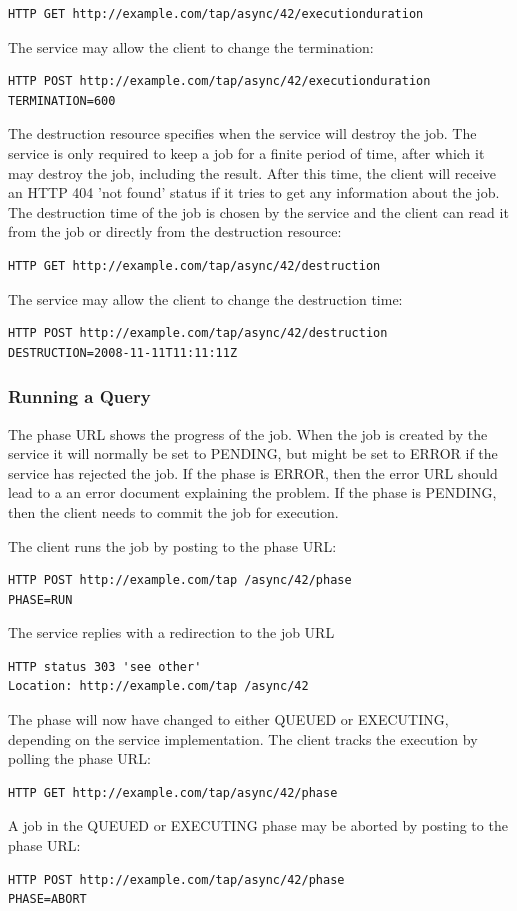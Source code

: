 \documentclass[11pt,a4paper]{ivoa}
\begin{document}
{\begin{verbatim}
HTTP GET http://example.com/tap/async/42/executionduration
\end{verbatim}
The service may allow the client to change the termination:
\begin{verbatim}
HTTP POST http://example.com/tap/async/42/executionduration
TERMINATION=600
\end{verbatim}
The destruction resource specifies when the service will destroy the job. The 
service is only required to keep a job for a finite period of time, after which 
it may destroy the job, including the result. After this time, the client will 
receive an HTTP 404 'not found' status if it tries to get any information about 
the job. The destruction time of the job is chosen by the service and the client 
can read it from the job or directly from the destruction resource:
\begin{verbatim}
HTTP GET http://example.com/tap/async/42/destruction
\end{verbatim}
The service may allow the client to change the destruction time:
\begin{verbatim}
HTTP POST http://example.com/tap/async/42/destruction
DESTRUCTION=2008-11-11T11:11:11Z
\end{verbatim}

\subsubsection{Running a Query}
The phase URL shows the progress of the job. When the job is created by the 
service it will normally be set to PENDING, but might be set to ERROR if the 
service has rejected the job. If the phase is ERROR, then the error URL should 
lead to a an error document explaining the problem. If the phase is PENDING, 
then the client needs to commit the job for execution.

The client runs the job by posting to the phase URL:
\begin{verbatim}
HTTP POST http://example.com/tap /async/42/phase
PHASE=RUN
\end{verbatim}

The service replies with a redirection to the job URL
\begin{verbatim}
HTTP status 303 'see other'
Location: http://example.com/tap /async/42
\end{verbatim}
The phase will now have changed to either QUEUED or EXECUTING, depending on the 
service implementation. The client tracks the execution by polling the phase 
URL:
\begin{verbatim}
HTTP GET http://example.com/tap/async/42/phase
\end{verbatim}
A job in the  QUEUED or EXECUTING phase may be aborted by posting to the phase 
URL:
\begin{verbatim}
HTTP POST http://example.com/tap/async/42/phase
PHASE=ABORT
\end{verbatim}

}
\end{document}
